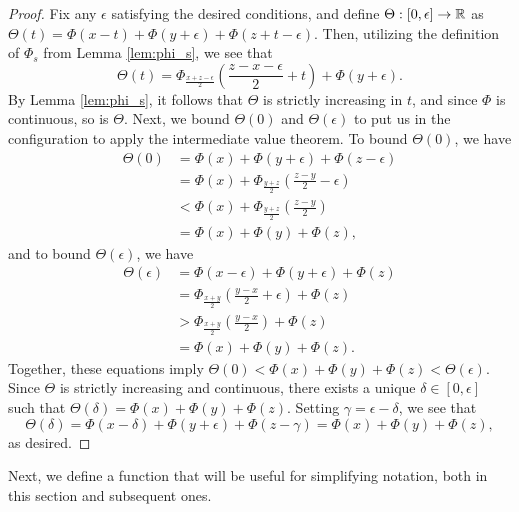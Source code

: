 \begin{proof}
Fix any $\epsilon$ satisfying the desired conditions, and define $\Theta: [0, \epsilon] \to \mathbb R$ as $\Theta(t) = \Phi(x - t) + \Phi(y + \epsilon) + \Phi(z + t - \epsilon)$. Then, utilizing the definition of $\Phi_s$ from Lemma \ref{lem:phi_s}, we see that $$\Theta(t) = \Phi_{\frac{x + z - \epsilon}{2}}(\frac{z - x - \epsilon}{2} + t) + \Phi(y + \epsilon).$$ By Lemma \ref{lem:phi_s}, it follows that $\Theta$ is strictly increasing in $t$, and since $\Phi$ is continuous, so is $\Theta$. Next, we bound $\Theta(0)$ and $\Theta(\epsilon)$ to put us in the configuration to apply the intermediate value theorem. To bound $\Theta(0)$, we have
\begin{equation*}
\begin{split}
\Theta(0) &= \Phi(x) + \Phi(y + \epsilon) + \Phi(z - \epsilon) \\
&= \Phi(x) + \Phi_{\frac{y+z}{2}}(\frac{z - y}{2} - \epsilon) \\
&< \Phi(x) + \Phi_{\frac{y+z}{2}}(\frac{z - y}{2}) \\
&= \Phi(x) + \Phi(y) + \Phi(z),
\end{split}
\end{equation*}
and to bound $\Theta(\epsilon)$, we have 
\begin{equation*}
\begin{split}
\Theta(\epsilon) &= \Phi(x - \epsilon) + \Phi(y + \epsilon) + \Phi(z) \\
&= \Phi_{\frac{x+y}{2}}(\frac{y- x}{2} + \epsilon) + \Phi(z)\\
&> \Phi_{\frac{x+y}{2}}(\frac{y - x}{2}) + \Phi(z) \\
&= \Phi(x) + \Phi(y) + \Phi(z).
\end{split}
\end{equation*}
Together, these equations imply $\Theta(0) < \Phi(x) + \Phi(y) + \Phi(z) < \Theta(\epsilon)$. Since $\Theta$ is strictly increasing and continuous, there exists a unique $\delta \in [0, \epsilon]$ such that $\Theta(\delta) = \Phi(x) + \Phi(y) + \Phi(z)$. Setting $\gamma = \epsilon - \delta$, we see that $$\Theta(\delta) = \Phi(x - \delta) + \Phi(y + \epsilon) + \Phi(z - \gamma) = \Phi(x) + \Phi(y) + \Phi(z),$$ as desired.


\end{proof}



Next, we define a function that will be useful for simplifying notation, both in this section and subsequent ones.

